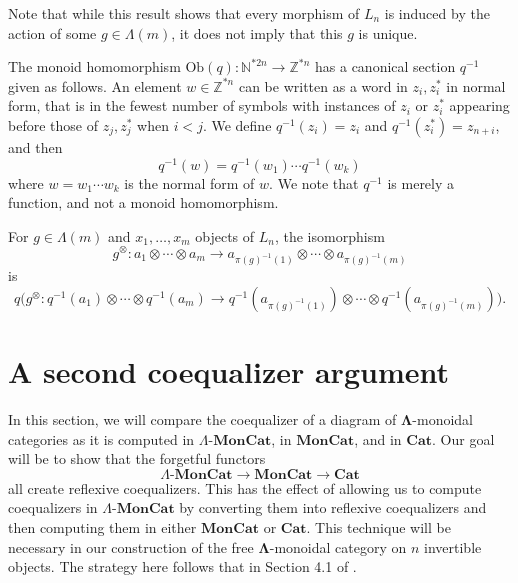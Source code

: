 \documentclass{amsbook} %
\newcommand{\mb}{\mathbf}
\newcommand{\ML}{\mathbf{\Lambda}}
\newcommand{\lmc}{\Lambda\mbox{-}\mb{MonCat}}
\newcommand{\moncat}{\ensuremath{\mb{MonCat}}}
\newcommand{\cat}{\ensuremath{\mb{Cat}}}
\numberwithin{section}{chapter}
\begin{document}
Note that while this result shows that every morphism of $L_n$ is induced by the action of some $g \in \Lambda(m)$, it does not imply that this $g$ is unique.

\begin{conv}
The monoid homomorphism $\mathrm{Ob}(q)  :  \mathbb{N}^{\ast 2n}  \to  \mathbb{Z}^{\ast n}$ has a canonical section $q^{-1}$ given as follows. An element $w \in \mathbb{Z}^{* n}$ can be written as a word in $z_i, z_i^*$ in normal form, that is in the fewest number of symbols with instances of $z_i$ or $z_i^*$ appearing before those of $z_j, z_j^*$ when $i < j$. We define $q^{-1}(z_i) = z_i$ and $q^{-1}(z_i^*) = z_{n+i}$, and then 
\[
q^{-1}(w) = q^{-1}(w_1) \cdots q^{-1}(w_k)
\]
where $w = w_1 \cdots w_k$ is the normal form of $w$. We note that $q^{-1}$ is merely a function, and not a monoid homomorphism.
\end{conv}

\begin{cor}\label{action_on_L}
For $g \in \Lambda(m)$ and $x_1, \ldots, x_m$ objects of $L_n$, the isomorphism
\[
g^{\otimes}: a_1 \otimes \cdots \otimes a_m \to a_{\pi(g)^{-1}(1)} \otimes \cdots \otimes a_{\pi(g)^{-1}(m)}
\]
is 
\[
q \Big(g^{\otimes}: q^{-1}(a_1) \otimes \cdots \otimes q^{-1}(a_m) \to   q^{-1}(a_{\pi(g)^{-1}(1)}) \otimes \cdots \otimes q^{-1}(a_{\pi(g)^{-1}(m)})    \Big).
\]
\end{cor}

\section{A second coequalizer argument}
In this section, we will compare the coequalizer of a diagram of $\ML$-monoidal categories as it is computed in $\lmc$, in $\moncat$, and in $\cat$. Our goal will be to show that the forgetful functors 
\[
\lmc \to \moncat \to \cat
\]
all create reflexive coequalizers. This has the effect of allowing us to compute coequalizers in $\lmc$ by converting them into reflexive coequalizers and then computing them in either $\moncat$ or $\cat$. This technique will be necessary in our construction of the free $\ML$-monoidal category on $n$ invertible objects. The strategy here follows that in Section 4.1 of \cite{lack-cod}.
\end{document}
